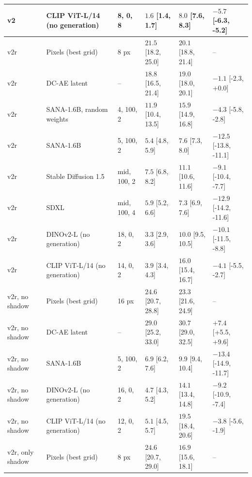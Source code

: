 \begin{tabular}{llllll}
v2 & CLIP ViT-L/14 (no generation) & 8, 0, 8 & $1.6$ \scriptsize{[1.4, 1.7]} & $8.0$ \scriptsize{[7.6, 8.3]} & $-5.7$ \scriptsize{[-6.3, -5.2]} \\
\midrule
v2r & Pixels (best grid) & 8 px & $21.5$ \scriptsize{[18.2, 25.0]} & $20.1$ \scriptsize{[18.8, 21.4]} & -- \\
v2r & DC-AE latent & -- & $18.8$ \scriptsize{[16.5, 21.4]} & $19.0$ \scriptsize{[18.0, 20.1]} & $-1.1$ \scriptsize{[-2.3, +0.0]} \\
v2r & SANA-1.6B, random weights & 4, 100, 2 & $11.9$ \scriptsize{[10.4, 13.5]} & $15.9$ \scriptsize{[14.9, 16.8]} & $-4.3$ \scriptsize{[-5.8, -2.8]} \\
v2r & SANA-1.6B & 5, 100, 2 & $5.4$ \scriptsize{[4.8, 5.9]} & $7.6$ \scriptsize{[7.3, 8.0]} & $-12.5$ \scriptsize{[-13.8, -11.1]} \\
v2r & Stable Diffusion 1.5 & mid, 100, 2 & $7.5$ \scriptsize{[6.8, 8.2]} & $11.1$ \scriptsize{[10.6, 11.6]} & $-9.1$ \scriptsize{[-10.4, -7.7]} \\
v2r & SDXL & mid, 100, 4 & $5.9$ \scriptsize{[5.2, 6.6]} & $7.3$ \scriptsize{[6.9, 7.6]} & $-12.9$ \scriptsize{[-14.2, -11.6]} \\
v2r & DINOv2-L (no generation) & 18, 0, 2 & $3.3$ \scriptsize{[2.9, 3.6]} & $10.0$ \scriptsize{[9.5, 10.5]} & $-10.1$ \scriptsize{[-11.5, -8.8]} \\
v2r & CLIP ViT-L/14 (no generation) & 14, 0, 2 & $3.9$ \scriptsize{[3.4, 4.3]} & $16.0$ \scriptsize{[15.4, 16.7]} & $-4.1$ \scriptsize{[-5.5, -2.7]} \\
\midrule
v2r, no shadow & Pixels (best grid) & 16 px & $24.6$ \scriptsize{[20.7, 28.8]} & $23.3$ \scriptsize{[21.6, 24.9]} & -- \\
v2r, no shadow & DC-AE latent & -- & $29.0$ \scriptsize{[25.2, 33.0]} & $30.7$ \scriptsize{[29.0, 32.5]} & $+7.4$ \scriptsize{[+5.5, +9.6]} \\
v2r, no shadow & SANA-1.6B & 5, 100, 2 & $6.9$ \scriptsize{[6.2, 7.6]} & $9.9$ \scriptsize{[9.4, 10.4]} & $-13.4$ \scriptsize{[-14.9, -11.7]} \\
v2r, no shadow & DINOv2-L (no generation) & 16, 0, 2 & $4.7$ \scriptsize{[4.3, 5.2]} & $14.1$ \scriptsize{[13.4, 14.8]} & $-9.2$ \scriptsize{[-10.9, -7.4]} \\
v2r, no shadow & CLIP ViT-L/14 (no generation) & 12, 0, 2 & $5.1$ \scriptsize{[4.5, 5.7]} & $19.5$ \scriptsize{[18.4, 20.6]} & $-3.8$ \scriptsize{[-5.6, -1.9]} \\
\midrule
v2r, only shadow & Pixels (best grid) & 8 px & $24.6$ \scriptsize{[20.7, 29.0]} & $16.9$ \scriptsize{[15.6, 18.1]} & -- \\

\end{tabular}

